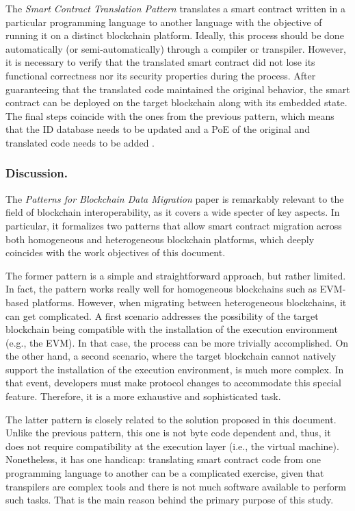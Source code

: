 \documentclass[runningheads]{llncs}
\begin{document}
The \textit{Smart Contract Translation Pattern} translates a smart contract written in a particular programming language to another language with the objective of running it on a distinct blockchain platform. Ideally, this process should be done automatically (or semi-automatically) through a compiler or transpiler. However, it is necessary to verify that the translated smart contract did not lose its functional correctness nor its security properties during the process. After guaranteeing that the translated code maintained the original behavior, the smart contract can be deployed on the target blockchain along with its embedded state. The final steps coincide with the ones from the previous pattern, which means that the ID database needs to be updated and a PoE of the original and translated code needs to be added \cite{bandara_xu_weber_2019}.

\subsubsection{Discussion.}
The \textit{Patterns for Blockchain Data Migration} paper is remarkably relevant to the field of blockchain interoperability, as it covers a wide specter of key aspects. In particular, it formalizes two patterns that allow smart contract migration across both homogeneous and heterogeneous blockchain platforms, which deeply coincides with the work objectives of this document.

The former pattern is a simple and straightforward approach, but rather limited. In fact, the pattern works really well for homogeneous blockchains such as EVM-based platforms. However, when migrating between heterogeneous blockchains, it can get complicated. A first scenario addresses the possibility of the target blockchain being compatible with the installation of the execution environment (e.g., the EVM). In that case, the process can be more trivially accomplished. On the other hand, a second scenario, where the target blockchain cannot natively support the installation of the execution environment, is much more complex. In that event, developers must make protocol changes to accommodate this special feature. Therefore, it is a more exhaustive and sophisticated task.

The latter pattern is closely related to the solution proposed in this document. Unlike the previous pattern, this one is not byte code dependent and, thus, it does not require compatibility at the execution layer (i.e., the virtual machine). Nonetheless, it has one handicap: translating smart contract code from one programming language to another can be a complicated exercise, given that transpilers are complex tools and there is not much software available to perform such tasks. That is the main reason behind the primary purpose of this study.
\end{document}
